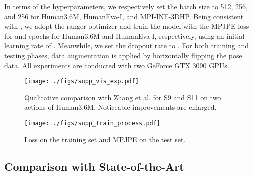 \documentclass[10pt,twocolumn,letterpaper]{article}
\begin{document}
In terms of the hyperparameters, we respectively set the batch size to 512, 256, and 256 for Human3.6M, HumanEva-I, and MPI-INF-3DHP. 
Being consistent with \cite{RN013}, we adopt the ranger optimizer and train the model with the MPJPE loss for  and  epochs for Human3.6M and HumanEva-I, respectively, using an initial learning rate of . Meanwhile, we set the dropout rate to . For both training and testing phases, data augmentation is applied by horizontally flipping the pose data. All experiments are conducted with two GeForce GTX 3090 GPUs.

\begin{figure*}[!ht]
	\begin{center}
\texttt{[image: ./figs/supp\_vis\_exp.pdf]}
	\end{center}
  \vspace{-8pt}
	\caption{Qualitative comparison with Zhang et al. \cite{zhang2022mixste} for S9 and S11 on two actions of Human3.6M. Noticeable improvements are enlarged. }
	\label{fig:qualitative_analysis}
	\vspace{-5pt}
\end{figure*}

\begin{figure}[]
  \begin{center}
      \texttt{[image: ./figs/supp\_train\_process.pdf]}
  \end{center}
  \vspace{-13pt}
  \caption{Loss on the training set and MPJPE on the test set. }
  \vspace{-15pt}
  \label{figure2:supp_train_process}
\end{figure}
\subsection{Comparison with State-of-the-Art}
\end{document}
